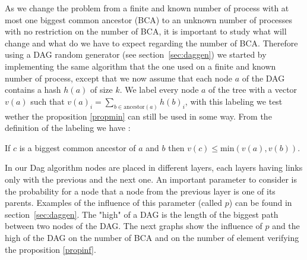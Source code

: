 As we change the problem from a finite and known number of process with at most one biggest common ancestor (BCA) to an unknown number of processes with no restriction on the number of BCA, it is important to study what will change and what do we have to expect regarding the number of BCA. Therefore using a DAG random generator (see section~\ref{sec:daggen}) we started by implementing the same algorithm that the one used on a finite and known number of process, except that we now assume that each node $a$ of the DAG contains a hash $h(a)$ of size $k$. We label every node $a$ of the tree with a vector $v(a)$ such that $v(a)_i=\sum_{b\in \mathrm{ancestor}(a)} h(b)_i$, with this labeling we test wether the proposition \ref{propmin} can still be used in some way. From the definition of the labeling we have :
\begin{proposition}
 If $c$ is a biggest common ancestor of $a$ and $b$ then $v(c) \leq \mathrm{min}(v(a),v(b))$. \label{propinf}
\end{proposition}
In our Dag algorithm nodes are placed in different layers, each layers having links only with the previous and the next one. An important parameter to consider is the probability for a node that a node from the previous layer is one of its parents. Examples of the influence of this parameter (called $p$) can be found in section~\ref{sec:daggen}. The "high" of a DAG is the length of the biggest path between two nodes of the DAG. The next graphs show the influence of $p$ and the high of the DAG on the number of BCA and on the number of element verifying the proposition \ref{propinf}.
